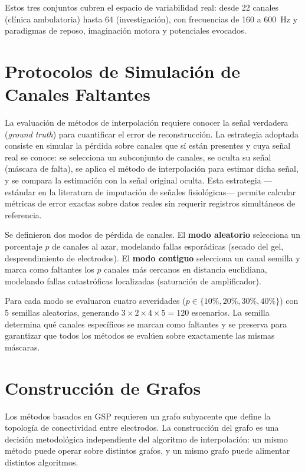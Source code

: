 Estos tres conjuntos cubren el espacio de variabilidad real: desde 22 canales (clínica ambulatoria) hasta 64 (investigación), con frecuencias de 160 a 600~Hz y paradigmas de reposo, imaginación motora y potenciales evocados.
\section{Protocolos de Simulación de Canales Faltantes}

La evaluación de métodos de interpolación requiere conocer la señal verdadera (\textit{ground truth}) para cuantificar el error de reconstrucción. La estrategia adoptada consiste en simular la pérdida sobre canales que sí están presentes y cuya señal real se conoce: se selecciona un subconjunto de canales, se oculta su señal (máscara de falta), se aplica el método de interpolación para estimar dicha señal, y se compara la estimación con la señal original oculta. Esta estrategia ---estándar en la literatura de imputación de señales fisiológicas--- permite calcular métricas de error exactas sobre datos reales sin requerir registros simultáneos de referencia.

Se definieron dos modos de pérdida de canales. El \textbf{modo aleatorio} selecciona un porcentaje $p$ de canales al azar, modelando fallas esporádicas (secado del gel, desprendimiento de electrodos). El \textbf{modo contiguo} selecciona un canal semilla y marca como faltantes los $p$ canales más cercanos en distancia euclidiana, modelando fallas catastróficas localizadas (saturación de amplificador).

Para cada modo se evaluaron cuatro severidades ($p \in \{10\%, 20\%, 30\%, 40\%\}$) con 5 semillas aleatorias, generando $3 \times 2 \times 4 \times 5 = 120$ escenarios. La semilla determina qué canales específicos se marcan como faltantes y se preserva para garantizar que todos los métodos se evalúen sobre exactamente las mismas máscaras.

\section{Construcción de Grafos}
\label{sec:graph_construction_methods}

Los métodos basados en GSP requieren un grafo subyacente que define la topología de conectividad entre electrodos. La construcción del grafo es una decisión metodológica independiente del algoritmo de interpolación: un mismo método puede operar sobre distintos grafos, y un mismo grafo puede alimentar distintos algoritmos.

